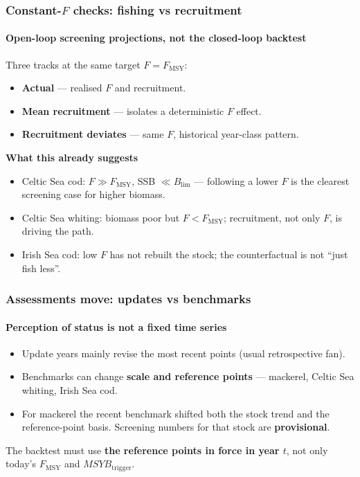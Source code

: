 \documentclass[
  aspectratio=169,
  t,
  onlytextwidth,
  10pt,
]{beamer}
\newcommand{\Fmsy}{F_{\mathrm{MSY}}}
\newcommand{\Blim}{B_{\lim}}
\newcommand{\Btrig}{MSYB_{\mathrm{trigger}}}
\begin{document}
\begin{frame}
  \frametitle{Constant-$F$ checks: fishing vs recruitment}
  \framesubtitle{Open-loop screening projections, not the closed-loop backtest}

  Three tracks at the same target $F=\Fmsy$:
  \begin{itemize}
    \item \textbf{Actual} --- realised $F$ and recruitment.
    \item \textbf{Mean recruitment} --- isolates a deterministic $F$ effect.
    \item \textbf{Recruitment deviates} --- same $F$, historical year-class pattern.
  \end{itemize}

  \vspace{0.3em}
  \textbf{What this already suggests}
  \begin{itemize}
    \item Celtic Sea cod: $F\gg\Fmsy$, SSB $\ll\Blim$ --- following a lower $F$ is the clearest screening case for higher biomass.
    \item Celtic Sea whiting: biomass poor but $F<\Fmsy$; recruitment, not only $F$, is driving the path.
    \item Irish Sea cod: low $F$ has not rebuilt the stock; the counterfactual is not ``just fish less''.
  \end{itemize}
\end{frame}

\begin{frame}
  \frametitle{Assessments move: updates vs benchmarks}
  \framesubtitle{Perception of status is not a fixed time series}

  \begin{itemize}
    \item Update years mainly revise the most recent points (usual retrospective fan).
    \item Benchmarks can change \textbf{scale and reference points} --- mackerel, Celtic Sea whiting, Irish Sea cod.
    \item For mackerel the recent benchmark shifted both the stock trend and the reference-point basis. Screening numbers for that stock are \textbf{provisional}.
  \end{itemize}

  \vspace{0.5em}
  The backtest must use \textbf{the reference points in force in year $t$}, not only today's $\Fmsy$ and $\Btrig$.
\end{frame}
\end{document}
